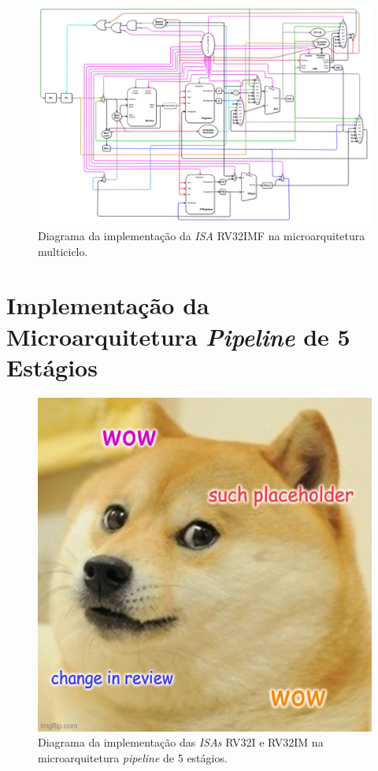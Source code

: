     \begin{figure}[H]
    \centering
        \includegraphics[width=1\linewidth]{../images/uarch_diagrams/multicycle-RV32IMF.png}
        \caption{Diagrama da implementação da \textit{ISA} RV32IMF na
        microarquitetura multiciclo.}\label{fig:diagram_rv32imf_multi}
    \end{figure}


\section{Implementação da Microarquitetura \textit{Pipeline} de 5 Estágios}

    \begin{figure}[H]
    \centering
        \includegraphics[width=1\linewidth]{../images/placeholder.jpg}
        \caption{Diagrama da implementação das \textit{ISAs} RV32I e RV32IM na
        microarquitetura \textit{pipeline} de 5 estágios.}\label{fig:diagram_rv32i_pipe}
    \end{figure}

